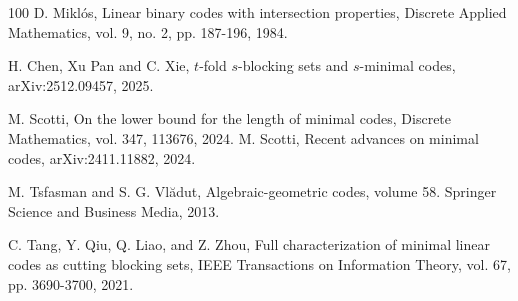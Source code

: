 \documentclass[12pt]{article}
\begin{document}
\begin{thebibliography}{100}
 D. Mikl\'{o}s, Linear binary codes with intersection properties, Discrete Applied Mathematics,
vol. 9, no. 2, pp. 187-196, 1984.


 H. Chen, Xu Pan and C. Xie, $t$-fold $s$-blocking sets and $s$-minimal codes, arXiv:2512.09457, 2025.




 M. Scotti, On the lower bound for the length of minimal codes, Discrete Mathematics, vol. 347, 113676, 2024.
 M. Scotti, Recent advances on minimal codes, arXiv:2411.11882, 2024.


 M. Tsfasman and S. G. Vl\u{a}dut, Algebraic-geometric codes, volume 58. Springer Science and
Business Media, 2013.


    C. Tang, Y. Qiu, Q. Liao, and Z. Zhou, Full characterization of minimal
linear codes as cutting blocking sets, IEEE Transactions on Information Theory, vol. 67, pp. 3690-3700, 2021.


\end{thebibliography}
\end{document}
